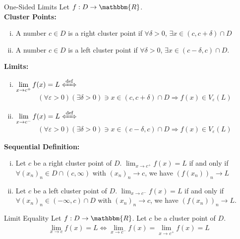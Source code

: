 \documentclass[10pt]{extarticle}
\newcommand{\R}{\mathbbm{R}}
\begin{document}
  \begin{problem}{One-Sided Limits}
    Let $f: D\rightarrow \R$.\\
    
    \textbf{Cluster Points:}
    \begin{enumerate}[(i)]
      \item A number $c\in D$ is a right cluster point if $\forall \delta > 0$, $\exists x\in (c,c+\delta) \cap D$
      \item A number $c\in D$ is a left cluster point if $\forall \delta > 0$, $\exists x\in (c-\delta,c) \cap D$.
    \end{enumerate}
    \textbf{Limits:}
    \begin{enumerate}[(i)]
      \item $\displaystyle \lim_{x\rightarrow c^{+}} f(x) = L \xLeftrightarrow{\text{def}}$
        \begin{align*}
          (\forall \varepsilon > 0)(\exists \delta > 0) \ni x\in (c,c+\delta)\cap D \Rightarrow f(x)\in V_{\varepsilon}(L)
        \end{align*}
      \item $\displaystyle \lim_{x\rightarrow c^{-}} f(x) = L \xLeftrightarrow{\text{def}}$
        \begin{align*}
          (\forall \varepsilon > 0)(\exists \delta > 0) \ni x\in (c-\delta,c) \cap D \Rightarrow f(x)\in V_{\varepsilon}(L)
        \end{align*}
    \end{enumerate}
    \textbf{Sequential Definition:}
    \begin{enumerate}[(i)]
      \item Let $c$ be a right cluster point of $D$. $\lim_{x\rightarrow c^{+}} f(x) = L$ if and only if $\forall (x_n)_n \in D\cap (c,\infty)$ with $(x_n)_n \rightarrow c$, we have $(f(x_n))_n \rightarrow L$
      \item Let $c$ be a left cluster point of $D$. $\lim_{x\rightarrow c^{-}} f(x) = L$ if and only if $\forall (x_n)_n \in (-\infty,c) \cap D$ with $(x_n)_n \rightarrow c$, we have $(f(x_n))_n \rightarrow L$.
    \end{enumerate}
  \end{problem}
  \begin{problem}{Limit Equality}
    Let $f:D\rightarrow \R$. Let $c$ be a cluster point of $D$.
    \begin{align*}
      \lim_{x\rightarrow c}f(x) = L \Leftrightarrow \lim_{x\rightarrow c^{-}}f(x) = \lim_{x\rightarrow c^{+}}f(x) = L
    \end{align*}
  \end{problem}
\end{document}
